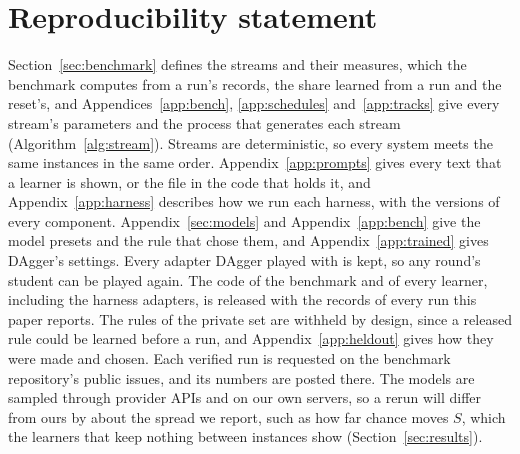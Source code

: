 \section*{Reproducibility statement}
\label{sec:reproducibility}

Section~\ref{sec:benchmark} defines the streams and their measures, which the benchmark computes from a run's records, the share learned from a run and the reset's, and Appendices~\ref{app:bench}, \ref{app:schedules} and~\ref{app:tracks} give every stream's parameters and the process that generates each stream (Algorithm~\ref{alg:stream}). Streams are deterministic, so every system meets the same instances in the same order. Appendix~\ref{app:prompts} gives every text that a learner is shown, or the file in the code that holds it, and Appendix~\ref{app:harness} describes how we run each harness, with the versions of every component. Appendix~\ref{sec:models} and Appendix~\ref{app:bench} give the model presets and the rule that chose them, and Appendix~\ref{app:trained} gives DAgger's settings. Every adapter DAgger played with is kept, so any round's student can be played again. The code of the benchmark and of every learner, including the harness adapters, is released with the records of every run this paper reports.  The rules of the private set are withheld by design, since a released rule could be learned before a run, and Appendix~\ref{app:heldout} gives how they were made and chosen. Each verified run is requested on the benchmark repository's public issues, and its numbers are posted there.  The models are sampled through provider APIs and on our own servers, so a rerun will differ from ours by about the spread we report, such as how far chance moves $S$, which the learners that keep nothing between instances show (Section~\ref{sec:results}).
